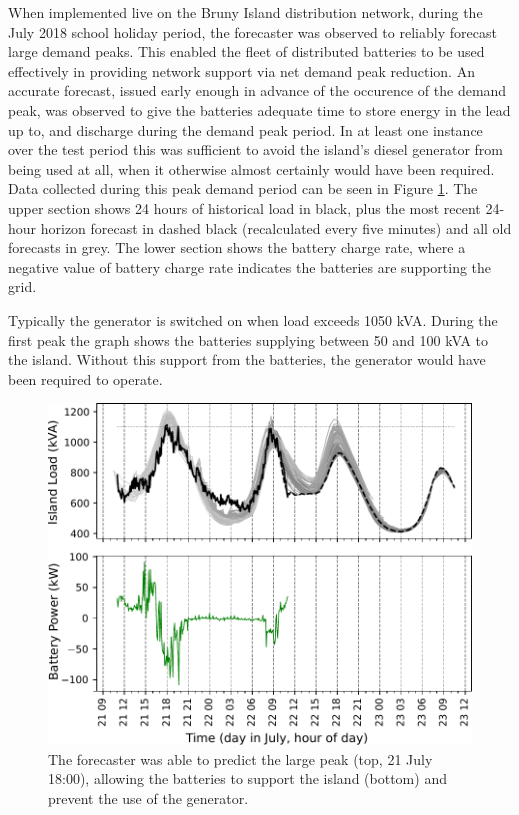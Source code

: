 \documentclass[conference]{IEEEtran}
\begin{document}
When implemented live on the Bruny Island distribution network, during the July 2018 school holiday period, the forecaster was observed to reliably forecast large demand peaks.
This enabled the fleet of distributed batteries to be used effectively in providing network support via net demand peak reduction. An accurate forecast, issued early enough in advance of the occurence of the demand peak, was observed to give the batteries adequate time to store energy in the lead up to, and discharge during the demand peak period. In at least one instance over the test period this was sufficient to avoid the island's diesel generator from being used at all, when it otherwise almost certainly would have been required.
Data collected during this peak demand period can be seen in Figure \ref{fig:bruny_nac}.
The upper section shows 24 hours of historical load in black, plus the most recent 24-hour horizon forecast in dashed black (recalculated every five minutes) and all old forecasts in grey.
The lower section shows the battery charge rate, where a negative value of battery charge rate indicates the batteries are supporting the grid.

Typically the generator is switched on when load exceeds 1050 kVA.
During the first peak the graph shows the batteries supplying between 50 and 100 kVA to the island.
Without this support from the batteries, the generator would have been required to operate.

\begin{figure}[htbp]
	\centerline{\includegraphics[width=.35\textwidth]{images/bruny_nac.pdf}}
	\caption{The forecaster was able to predict the large peak (top, 21 July 18:00), allowing the batteries to support the island (bottom) and prevent the use of the generator.}
	\label{fig:bruny_nac}
\end{figure}
\end{document}
